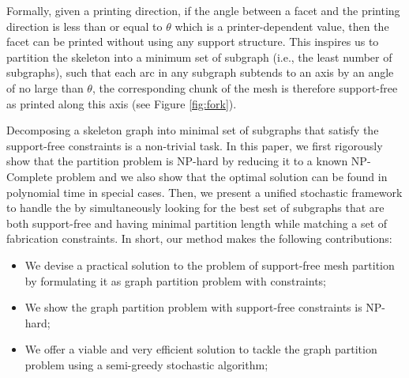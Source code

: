 Formally, given a printing direction, if the angle between a facet and the printing direction is less than or equal to $\theta$ which is a printer-dependent value, then the facet can be printed without using any support structure. {\color{blue}This inspires us to partition the skeleton into a minimum set of subgraph (i.e., the least number of subgraphs)}, such that each arc in any subgraph subtends to an axis by an angle of no large than $\theta$, the corresponding chunk of the mesh is therefore support-free as printed along this axis (see Figure \ref{fig:fork}). %


{Decomposing a skeleton graph into minimal set of subgraphs that satisfy the support-free constraints is a non-trivial task. In this paper, we first rigorously show that the partition problem is NP-hard by reducing it to a known NP-Complete problem and we also show that the optimal solution can be found in polynomial time in {special} cases. Then, we present a unified stochastic framework to handle the  by simultaneously looking for} the best set of subgraphs that are both support-free and having minimal partition length while matching a set of fabrication constraints. In short, our method makes the following contributions:

{
\begin{itemize}
\item {We devise a practical solution to the problem of support-free mesh partition by formulating it as graph partition problem with constraints;}
\item {We show the graph partition problem with support-free constraints is NP-hard;}
\item {We offer a viable and very efficient solution to tackle the graph partition problem using a semi-greedy stochastic algorithm;}
\end{itemize}
}
